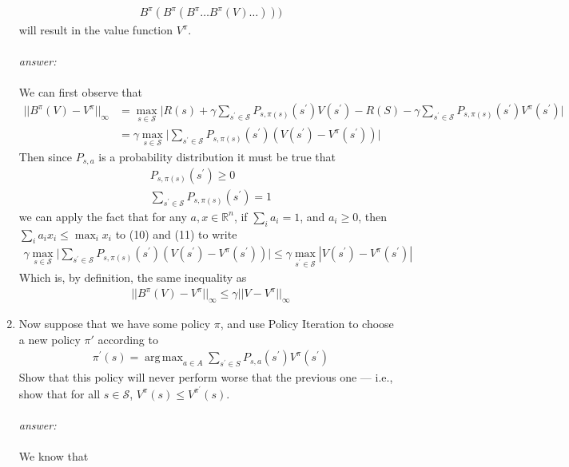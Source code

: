 \documentclass{article}
\DeclareMathOperator*{\argmax}{arg\,max}
\begin{document}
\begin{enumerate}[label=(\alph*)]
\begin{align*}
    B^\pi(B^\pi (B^\pi\dots B^\pi(V)\dots ))) 
\end{align*}will result in the value function $V^\pi$.\\\\
\textit{answer:}\\\\
We can first observe that 
\begin{align*}
    ||B^\pi(V)-V^\pi ||_\infty &= \max_{s\in \mathcal{S}}\big |R(s)+\gamma \sum_{s^\prime \in \mathcal{S}}P_{s,\pi(s)}(s^\prime )V(s^\prime)-R(S)-\gamma \sum_{s^\prime \in \mathcal{S}}P_{s,\pi(s)}(s^\prime )V^\pi(s^\prime)\big |\\
    &= \gamma \max_{s\in \mathcal{S}}\big |\sum_{s^\prime \in \mathcal{S}}P_{s,\pi(s)}(s^\prime )(V(s^\prime)-V^\pi (s^\prime))\big |
\end{align*}
Then since $P_{s,a}$ is a probability distribution it must be true that \begin{align}
    P_{s,\pi(s)}(s^\prime )\geq 0\\
    \sum_{s^\prime \in \mathcal{S}}P_{s,\pi(s)}(s^\prime) = 1
\end{align} 
we can apply the fact that for any $a, x\in \mathbb{R}^n$, if $\sum_i a_i = 1$, and $a_i\geq 0$, then $\sum_i a_ix_i\leq \max_i x_i$ to (10) and (11) to write
\begin{align*}
    \gamma \max_{s\in \mathcal{S}}\big |\sum_{s^\prime \in \mathcal{S}}P_{s,\pi(s)}(s^\prime )(V(s^\prime)-V^\pi (s^\prime))\big |\leq \gamma\max_{s^\prime\in \mathcal{S}} |V(s^\prime)-V^\pi(s^\prime)|
\end{align*}
Which is, by definition, the same inequality as
\begin{align*}
     ||B^\pi(V)-V^\pi ||_\infty\leq \gamma ||V-V^\pi ||_\infty
\end{align*}
\item Now suppose that we have some policy $\pi$, and use Policy Iteration to choose a new policy $\pi\prime$ according to
\begin{align*}
    \pi^\prime(s) = \argmax_{a\in A}\sum_{s^\prime\in S}P_{s,a}(s^\prime)V^\pi (s^\prime)
\end{align*}
Show that this policy will never perform worse that the previous one — i.e., show that for all $s \in \mathcal{S}$, $V^\pi(s) \leq V^{\pi^\prime}(s)$.\\\\
\textit{answer:}\\\\
We know that
\begin{align*}

\end{align*}
\end{enumerate}
\end{document}
